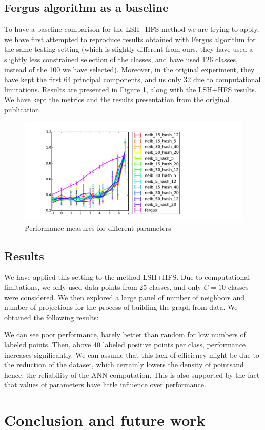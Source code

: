 \documentclass{article} %
\begin{document}
\subsection{Fergus algorithm as a baseline}
To have a baseline comparison for the LSH+HFS method we are trying to apply, we have first attempted to reproduce results obtained with Fergus algorithm for the same testing setting (which is slightly different from ours, they have used a slightly less constrained selection of the classes, and have used 126 classes, instead of the 100 we have selected). Moreover, in the original experiment, they have kept the first 64 principal components, and us only 32 due 
to computational limitations. Results are presented in Figure \ref{variation}, along with the LSH+HFS results. We have kept the metrics and the results presentation from the original publication.

\begin{figure}[!h]
  \hspace{-3cm}
  \includegraphics[width=1.8\textwidth]{method_comp.pdf}
  \caption{Performance measures for different parameters}
  \label{variation}
\end{figure}

\subsection{Results}
We have applied this setting to the method LSH+HFS. Due to computational limitations, we only used data points from 25 classes, and only $C=10$ classes were considered. We then explored a large panel of number of neighbors and number of projections for the process of building the graph from data. We obtained the following results:



We can see poor performance, barely better than random for low numbers of labeled points. Then, above 40 labeled positive points per class, performance increases significantly. We can assume that this lack of efficiency might be due to the reduction of the dataset, which certainly lowers the density of pointsand hence, the reliability of the ANN computation. This is also supported by the fact that values of parameters have little influence over performance.

\section{Conclusion and future work}
\end{document}
